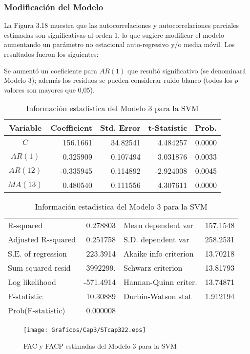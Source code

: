 \subsubsection*{Modificaci\'{o}n del Modelo}

La Figura 3.18 muestra que las autocorrelaciones y autocorrelaciones parciales estimadas son significativas al orden 1, lo que sugiere modificar el modelo aumentando un par\'{a}metro no estacional auto-regresivo y/o media m\'{o}vil. Los resultados fueron los siguientes:\newline

Se aument\'{o} un coeficiente para $AR(1)$ que result\'{o} significativo (se denominar\'{a} Modelo 3); adem\'{a}s los residuos se pueden considerar ruido blanco (todos los $p$-valores son mayores que 0,05).

\begin{table}[H]
\centering\small
\caption{Informaci\'{o}n estad\'{i}stica del Modelo 3 para la SVM}
\begin{tabular}{@{}crrrr@{}}
\toprule
Variable& Coefficient& Std. Error& t-Statistic& Prob. \\
\midrule
$C$& 156.1661& 34.82541& 4.484257& 0.0000 \\
$AR(1)$& 0.325909& 0.107494& 3.031876& 0.0033 \\
$AR(12)$& -0.335945& 0.114892& -2.924008& 0.0045 \\
$MA(13)$& 0.480540& 0.111556& 4.307611& 0.0000 \\
\bottomrule
\end{tabular}

\begin{tabular}{@{}lrlr@{}}
\toprule
R-squared& 0.278803& Mean dependent var & 157.1548 \\
Adjusted R-squared& 0.251758& S.D. dependent var & 258.2531 \\
S.E. of regression& 223.3914& Akaike info criterion & 13.70218 \\
Sum squared resid& 3992299.& Schwarz criterion & 13.81793 \\
Log likelihood& -571.4914& Hannan-Quinn criter. & 13.74871 \\
F-statistic& 10.30889& Durbin-Watson stat & 1.912194 \\
Prob(F-statistic)& 0.000008& &  \\
\bottomrule
\end{tabular}
\label{tab17}
\end{table}

\begin{figure}[H]
\centering
\texttt{[image: Graficos/Cap3/STcap322.eps]}
\caption{FAC y FACP estimadas del Modelo 3 para la SVM}
\end{figure}


